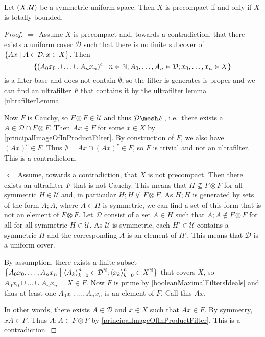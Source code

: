 \begin{proposition}
Let $\left( X,\mathcal{U} \right)$ be a symmetric uniform space. Then $X$ is precompact \textup{if and only if} $X$ is totally bounded.
\end{proposition}
\begin{proof}
$\boxed{\Rightarrow}$ Assume $X$ is precompact and, towards a contradiction, that there exists a uniform cover $\mathcal{D}$ such that there is no finite subcover of $\left\{ Ax \;\middle|\; A\in \mathcal{D}, x\in X \right\}$. Then
\[ \left\{ (A_0x_0\cup \ldots \cup A_nx_n)^c \;\middle|\; n\in \mathbb{N}; A_0,\ldots, A_n \in \mathcal{D}; x_0, \ldots, x_n\in X \right\} \]
is a filter base and does not contain $\emptyset$, so the filter is generates is proper and we can find an ultrafilter $F$ that contains it by the ultrafilter lemma \ref{ultrafilterLemma}.

Now $F$ is Cauchy, so $F\otimes F\in \mathcal{U}$ and thus $\mathcal{D}\mesh F$, i.e.\ there exists a $A\in \mathcal{D}\cap F\otimes F$. Then $Ax\in F$ for some $x\in X$ by \ref{principalImageOfInProductFilter}. By construction of $F$, we also have $(Ax)^c\in F$. Thus $\emptyset =  Ax \cap (Ax)^c \in F$, so $F$ is trivial and not an ultrafilter. This is a contradiction.

$\boxed{\Leftarrow}$ Assume, towards a contradiction, that $X$ is not precompact. Then there exists an ultrafilter $F$ that is not Cauchy. This means that $H \not\subseteq F\otimes F$ for all symmetric $H\in\mathcal{U}$ and, in particular $H;H \not\subseteq F\otimes F$. As $H;H$ is generated by sets of the form $A;A$, where $A\in H$ is symmetric, we can find a set of this form that is not an element of $F\otimes F$. Let $\mathcal{D}$ consist of a set $A\in H$ such that $A;A\notin F\otimes F$ for all for all symmetric $H\in \mathcal{U}$. As $\mathcal{U}$ is symmetric, each $H'\in \mathcal{U}$ contains a symmetric $H$ and the corresponding $A$ is an element of $H'$. This means that $\mathcal{D}$ is a uniform cover.

By assumption, there exists a finite subset $\left\{ A_0x_0, \ldots, A_nx_n \;\middle|\; \left\langle A_k \right\rangle_{k=0}^n\in \mathcal{D}^{\mathbb{N}}; \left\langle x_k \right\rangle_{k=0}^n \in X^{\mathbb{N}} \right\}$ that covers $X$, so $A_0x_0 \cup \ldots \cup A_nx_n = X \in F$. Now $F$ is prime by \ref{booleanMaximalFiltersIdeals} and thus at least one $A_0x_0, \ldots, A_nx_n$ is an element of $F$. Call this $Ax$.

In other words, there exists $A\in \mathcal{D}$ and $x\in X$ such that $Ax \in F$. By symmetry, $xA\in F$. Thus $A;A\in F\otimes F$ by \ref{principalImageOfInProductFilter}. This is a contradiction.
\end{proof}


